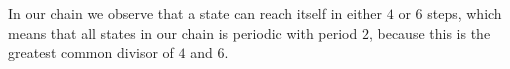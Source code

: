 In our chain we observe that a state can reach itself in either $4$ or $6$ steps, which means that all states in our chain is periodic with period $2$, because this is the greatest common divisor of $4$ and $6$.
